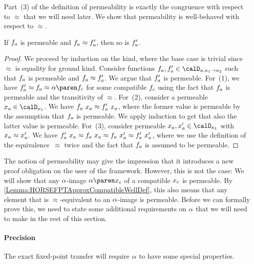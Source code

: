 \documentclass[../../diss.tex]{subfiles}
\begin{document}
Part~(3) of the definition of permeability is exactly the congruence with respect to $\approx$ that we will need later.
We show that permeability is well-behaved with respect to $\approx$.

\begin{lemma}%
\label{Lemma:HORSEFPTApproxCompatibleWellDef}%
    If $f_a$ is permeable and $f_a \approx f_a'$, then so is $f_a'$.
\end{lemma}

\begin{proof}
    We proceed by induction on the kind, where the base case is trivial since $\approx$ is equality for ground kind.
    Consider functions $\fa, \fa' \in \domaina{\kappa_1 \to \kappa_2}$ such that $f_a$ is permeable and $f_a \approx f_a'$.
    We argue that $f_a'$ is permeable.
    For~(1), we have $\fa' \approx \fa \approx \abs{\fc}$ for some compatible $f_c$ using the fact that $f_a$ is permeable and the transitivity of $\approx$.
    For~(2), consider a permeable $\xa \in \domain{\kappa_1}$.
    We have $f_a \  x_a \approx f_a' \  x_a$, where the former value is permeable by the assumption that $f_a$ is permeable.
    We apply induction to get that also the latter value is permeable.
    For~(3), consider permeable $\xa, \xa' \in \domain{\kappa_1}$ with $x_a \approx x_a'$.
    We have $f_a' \  x_a \approx f_a \  x_a \approx f_a \  x_a' \approx f_a' \  x_a'$, where we use the definition of the equivalence~$\approx$ twice and the fact that $f_a$ is assumed to be permeable.
\end{proof}

The notion of permeability may give the impression that it introduces a new proof obligation on the user of the framework.
However, this is not the case: We will show that any $\abs$-image $\abs{\xc}$ of a compatible $x_c$ is permeable.
By \cref{Lemma:HORSEFPTApproxCompatibleWellDef}, this also means that any element that is $\approx$-equivalent to an $\abs$-image is permeable.
Before we can formally prove this, we need to state some additional requirements on $\abs$ that we will need to make in the rest of this section.

\paragraph{Precision}

The exact fixed-point transfer will require $\abs$ to have some special properties.
\end{document}

